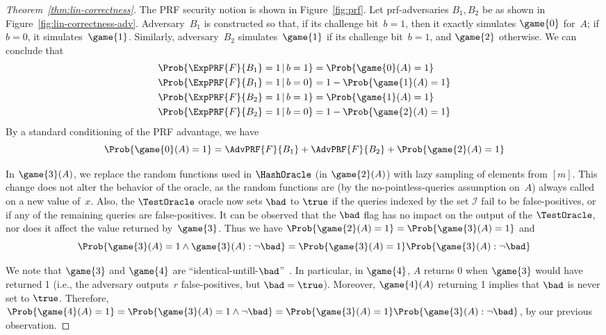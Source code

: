 \begin{proof}[Theorem~\ref{thm:lin-correctness}]
The PRF security notion is shown in Figure~\ref{fig:prf}. Let
prf-adversaries $B_1, B_2$ be as shown in Figure~\ref{fig:lin-correctness-adv}.
Adversary~$B_1$ is constructed so that, if its challenge bit~$b=1$,
then it exactly simulates $\game{0}$ for~$A$; if $b=0$, it
simulates~$\game{1}$.  Similarly, adversary~$B_2$ simulates~$\game{1}$
if its challenge bit~$b=1$, and $\game{2}$ otherwise.  We can conclude
that 
\begin{align*}
\Prob{\ExpPRF{F}{B_1} = 1\,|\,b=1} &= \Prob{\game{0}(A)=1} \\%
\Prob{\ExpPRF{F}{B_1} = 1\,|\,b=0} &= 1-\Prob{\game{1}(A)=1} \\%
\Prob{\ExpPRF{F}{B_2} = 1\,|\,b=1} &= \Prob{\game{1}(A)=1} \\%
\Prob{\ExpPRF{F}{B_2} = 1\,|\,b=0} &= 1-\Prob{\game{2}(A)=1} \\%
\end{align*}
%
\noindent
By a standard conditioning of the PRF advantage, we have 
\begin{equation*}
\Prob{\game{0}(A)=1} = \AdvPRF{F}{B_1} +\AdvPRF{F}{B_2} + \Prob{\game{2}(A)=1}%
\end{equation*}


In $\game{3}(A)$, we replace the random functions used in
$\HashOracle$ (in $\game{2}(A)$) with lazy sampling of elements from
$[m]$.  This change does not alter the behavior of the oracle, as the
random functions are (by the no-pointless-queries assumption on~$A$) always called on a new
value of~$x$.
%
Also, the $\TestOracle$ oracle now sets $\bad$ to $\true$ if the
queries indexed by the set $\mathcal{I}$ fail to be false-positives,
or if any of the remaining queries are false-positives. It can be
observed that the $\bad$ flag has no impact on the output of the
$\TestOracle$, nor does it affect  the value returned
by~$\game{3}$. Thus we have $\Prob{\game{2}(A)=1} =
\Prob{\game{3}(A)=1}$ and
\[
\Prob{\game{3}(A)=1 \wedge \game{3}(A): \neg\bad} = \Prob{\game{3}(A)=1} \Prob{\game{3}(A) : \neg\bad}%
\]

We note that $\game{3}$ and $\game{4}$ are
``identical-untill-$\bad$''~\cite{bellare2004game}.  In particular,
in $\game{4}$, $A$ returns 0 when $\game{3}$ would have returned 1 (i.e.,
the adversary outputs~$r$ false-positives, but $\bad=\true$).  
Moreover,  $\game{4}(A)$ returning 1 implies that $\bad$ is never set to $\true$. Therefore,
$\Prob{\game{4}(A)=1} = \Prob{\game{3}(A)=1 \wedge \neg\bad} =
\Prob{\game{3}(A)=1} \Prob{\game{3}(A) : \neg\bad}$, by our previous observation.


\end{proof}
